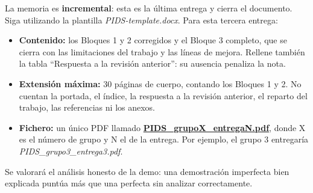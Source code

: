 \documentclass[12pt,a4paper]{article}
\begin{document}
La memoria es \textbf{incremental}: esta es la última entrega y cierra el documento. Siga utilizando la plantilla \textit{PIDS-template.docx}. Para esta tercera entrega:

\begin{itemize}
    \item \textbf{Contenido:} los Bloques 1 y 2 corregidos y el Bloque 3 completo, que se cierra con las limitaciones del trabajo y las líneas de mejora. Rellene también la tabla ``Respuesta a la revisión anterior'': su ausencia penaliza la nota.
    \item \textbf{Extensión máxima:} 30 páginas de cuerpo, contando los Bloques 1 y 2. No cuentan la portada, el índice, la respuesta a la revisión anterior, el reparto del trabajo, las referencias ni los anexos.
    \item \textbf{Fichero:} un único PDF llamado \underline{\textbf{PIDS\_grupoX\_entregaN.pdf}}, donde X es el número de grupo y N el de la entrega. Por ejemplo, el grupo 3 entregaría \textit{PIDS\_grupo3\_entrega3.pdf}.
\end{itemize}

Se valorará el análisis honesto de la demo: una demostración imperfecta bien explicada puntúa más que una perfecta sin analizar correctamente.
\end{document}
